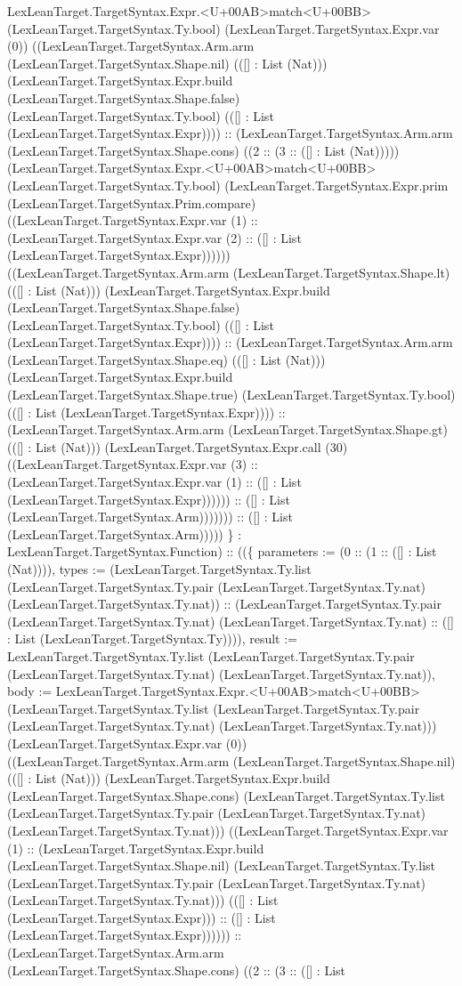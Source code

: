 \documentclass[11pt]{article}
\begin{document}
LexLeanTarget.TargetSyntax.Expr.<U+00AB>match<U+00BB> (LexLeanTarget.TargetSyntax.Ty.bool) (LexLeanTarget.TargetSyntax.Expr.var (0)) ((LexLeanTarget.TargetSyntax.Arm.arm (LexLeanTarget.TargetSyntax.Shape.nil) (([] : List (Nat))) (LexLeanTarget.TargetSyntax.Expr.build (LexLeanTarget.TargetSyntax.Shape.false) (LexLeanTarget.TargetSyntax.Ty.bool) (([] : List (LexLeanTarget.TargetSyntax.Expr)))) :: (LexLeanTarget.TargetSyntax.Arm.arm (LexLeanTarget.TargetSyntax.Shape.cons) ((2 :: (3 :: ([] : List (Nat))))) (LexLeanTarget.TargetSyntax.Expr.<U+00AB>match<U+00BB> (LexLeanTarget.TargetSyntax.Ty.bool) (LexLeanTarget.TargetSyntax.Expr.prim (LexLeanTarget.TargetSyntax.Prim.compare) ((LexLeanTarget.TargetSyntax.Expr.var (1) :: (LexLeanTarget.TargetSyntax.Expr.var (2) :: ([] : List (LexLeanTarget.TargetSyntax.Expr)))))) ((LexLeanTarget.TargetSyntax.Arm.arm (LexLeanTarget.TargetSyntax.Shape.lt) (([] : List (Nat))) (LexLeanTarget.TargetSyntax.Expr.build (LexLeanTarget.TargetSyntax.Shape.false) (LexLeanTarget.TargetSyntax.Ty.bool) (([] : List (LexLeanTarget.TargetSyntax.Expr)))) :: (LexLeanTarget.TargetSyntax.Arm.arm (LexLeanTarget.TargetSyntax.Shape.eq) (([] : List (Nat))) (LexLeanTarget.TargetSyntax.Expr.build (LexLeanTarget.TargetSyntax.Shape.true) (LexLeanTarget.TargetSyntax.Ty.bool) (([] : List (LexLeanTarget.TargetSyntax.Expr)))) :: (LexLeanTarget.TargetSyntax.Arm.arm (LexLeanTarget.TargetSyntax.Shape.gt) (([] : List (Nat))) (LexLeanTarget.TargetSyntax.Expr.call (30) ((LexLeanTarget.TargetSyntax.Expr.var (3) :: (LexLeanTarget.TargetSyntax.Expr.var (1) :: ([] : List (LexLeanTarget.TargetSyntax.Expr)))))) :: ([] : List (LexLeanTarget.TargetSyntax.Arm))))))) :: ([] : List (LexLeanTarget.TargetSyntax.Arm))))) \} : LexLeanTarget.TargetSyntax.Function) :: ((\{ parameters := (0 :: (1 :: ([] : List (Nat)))), types := (LexLeanTarget.TargetSyntax.Ty.list (LexLeanTarget.TargetSyntax.Ty.pair (LexLeanTarget.TargetSyntax.Ty.nat) (LexLeanTarget.TargetSyntax.Ty.nat)) :: (LexLeanTarget.TargetSyntax.Ty.pair (LexLeanTarget.TargetSyntax.Ty.nat) (LexLeanTarget.TargetSyntax.Ty.nat) :: ([] : List (LexLeanTarget.TargetSyntax.Ty)))), result := LexLeanTarget.TargetSyntax.Ty.list (LexLeanTarget.TargetSyntax.Ty.pair (LexLeanTarget.TargetSyntax.Ty.nat) (LexLeanTarget.TargetSyntax.Ty.nat)), body := LexLeanTarget.TargetSyntax.Expr.<U+00AB>match<U+00BB> (LexLeanTarget.TargetSyntax.Ty.list (LexLeanTarget.TargetSyntax.Ty.pair (LexLeanTarget.TargetSyntax.Ty.nat) (LexLeanTarget.TargetSyntax.Ty.nat))) (LexLeanTarget.TargetSyntax.Expr.var (0)) ((LexLeanTarget.TargetSyntax.Arm.arm (LexLeanTarget.TargetSyntax.Shape.nil) (([] : List (Nat))) (LexLeanTarget.TargetSyntax.Expr.build (LexLeanTarget.TargetSyntax.Shape.cons) (LexLeanTarget.TargetSyntax.Ty.list (LexLeanTarget.TargetSyntax.Ty.pair (LexLeanTarget.TargetSyntax.Ty.nat) (LexLeanTarget.TargetSyntax.Ty.nat))) ((LexLeanTarget.TargetSyntax.Expr.var (1) :: (LexLeanTarget.TargetSyntax.Expr.build (LexLeanTarget.TargetSyntax.Shape.nil) (LexLeanTarget.TargetSyntax.Ty.list (LexLeanTarget.TargetSyntax.Ty.pair (LexLeanTarget.TargetSyntax.Ty.nat) (LexLeanTarget.TargetSyntax.Ty.nat))) (([] : List (LexLeanTarget.TargetSyntax.Expr))) :: ([] : List (LexLeanTarget.TargetSyntax.Expr)))))) :: (LexLeanTarget.TargetSyntax.Arm.arm (LexLeanTarget.TargetSyntax.Shape.cons) ((2 :: (3 :: ([] : List 
\end{document}
